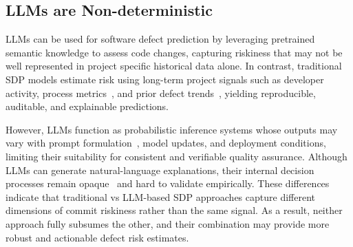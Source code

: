 \documentclass[\main/thesis.tex]{subfiles}
\begin{document}
\subsection{LLMs are Non-deterministic}
%


LLMs can be used for software defect prediction by leveraging pretrained semantic knowledge to assess code changes, capturing riskiness that may not be well represented in project specific historical data alone.
In contrast, traditional SDP models estimate risk using long-term project signals such as developer activity, process metrics~\cite{prem2013}, and prior defect trends~\cite{Jureckzo}, yielding reproducible, auditable, and explainable predictions.

However, LLMs function as probabilistic inference systems whose outputs may vary with prompt formulation~\cite{zhang2025prompt}, model updates, and deployment conditions, limiting their suitability for consistent and verifiable quality assurance. Although LLMs can generate natural-language explanations, their internal decision processes remain opaque~\cite{palikhe2025towards} and hard to validate empirically. These differences indicate that traditional vs LLM-based SDP approaches capture different dimensions of commit riskiness rather than the same signal. As a result, neither approach fully subsumes the other, and their combination may provide more robust and actionable defect risk estimates.
\end{document}
